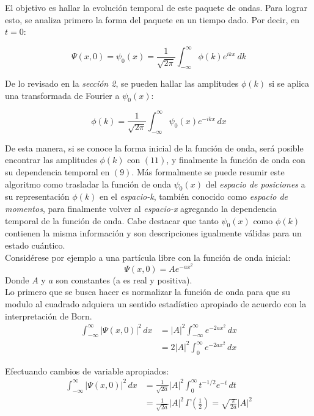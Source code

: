 El objetivo es hallar la evolución temporal de este paquete de ondas. Para lograr esto, se analiza primero la forma del
paquete en un tiempo dado. Por decir, en $t=0$:

\begin{equation}
    \Psi(x,0) = \psi_{0}(x) = \frac{1}{\sqrt{2\pi}} \int_{-\infty}^{\infty} \phi(k)e^{ikx}\,dk
\end{equation}

De lo revisado en la \emph{sección 2}, se pueden hallar las amplitudes $\phi(k)$ si se aplica una transformada de Fourier
a $\psi_{0}(x)$:

\begin{equation}
    \phi(k) = \frac{1}{\sqrt{2\pi}} \int_{-\infty}^{\infty} \psi_{0}(x)e^{-ikx}\,dx
\end{equation}

De esta manera, si se conoce la forma inicial de la función de onda, será posible encontrar las amplitudes $\phi(k)$ con
$(11)$, y finalmente la función de onda con su dependencia temporal en $(9)$. Más formalmente se puede resumir este
algoritmo como trasladar la función de onda $\psi_{0}(x)$ del \emph{espacio de posiciones} a su representación $\phi(k)$
en el \emph{espacio-k}, también conocido como \emph{espacio de momentos}, para finalmente volver al \emph{espacio-x}
agregando la dependencia temporal de la función de onda. Cabe destacar que tanto $\psi_{0}(x)$ como $\phi(k)$ contienen
la misma información y son descripciones igualmente válidas para un estado cuántico.\\

Considérese por ejemplo a una partícula libre con la función de onda inicial:
\begin{equation}
    \Psi(x,0) = Ae^{-ax^2}
\end{equation}
Donde $A$ y $a$ son constantes (a es real y positiva).\\

Lo primero que se busca hacer es normalizar la función de onda para que su modulo al cuadrado adquiera un sentido
estadístico apropiado de acuerdo con la interpretación de Born.
\begin{align*}
    \int_{-\infty}^{\infty} \lvert\Psi(x,0)\rvert^2\,dx & = \lvert A \rvert^2 \int_{-\infty}^{\infty} e^{-2ax^2}\,dx \\
                                                        & = 2\lvert A \rvert^2 \int_{0}^{\infty} e^{-2ax^2}\,dx
\end{align*}

Efectuando cambios de variable apropiados:
\begin{align*}
    \int_{-\infty}^{\infty} \lvert\Psi(x,0)\rvert^2\,dx & = \frac{1}{\sqrt{2a}} \lvert A \rvert^2 \int_{0}^{\infty} t^{-1/2}e^{-t}\,dt                            \\
                                                        & = \frac{1}{\sqrt{2a}} \lvert A \rvert^2 \,\Gamma(\frac{1}{2}) = \sqrt{\frac{\pi}{2a}} \lvert A \rvert^2
\end{align*}

